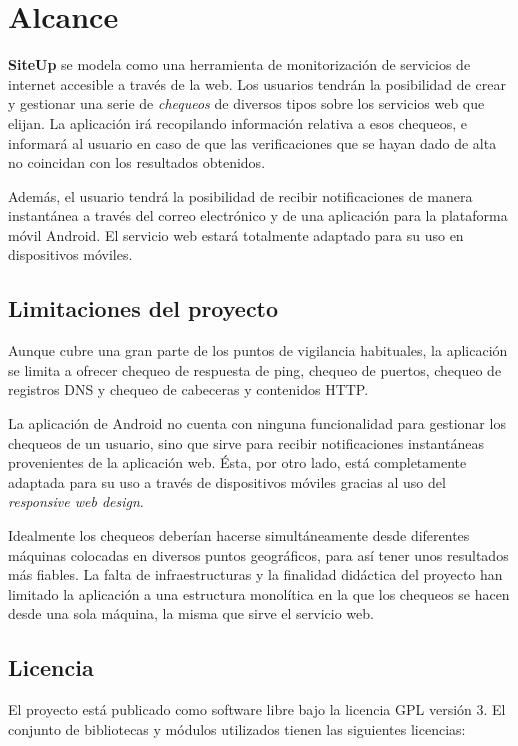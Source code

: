 \section{Alcance}
\textbf{SiteUp} se modela como una herramienta de monitorización de servicios de
internet accesible a través de la web. Los usuarios tendrán la posibilidad de
crear y gestionar una serie de \textit{chequeos} de diversos tipos sobre los
servicios web que elijan. La aplicación irá recopilando información relativa a
esos chequeos, e informará al usuario en caso de que las verificaciones que se
hayan dado de alta no coincidan con los resultados obtenidos.

Además, el usuario tendrá la posibilidad de recibir notificaciones de manera
instantánea a través del correo electrónico y de una aplicación para la
plataforma móvil Android. El servicio web estará totalmente adaptado para su uso
en dispositivos móviles.

\subsection{Limitaciones del proyecto}
Aunque cubre una gran parte de los puntos de vigilancia habituales, la
aplicación se limita a ofrecer chequeo de respuesta de ping, chequeo de puertos,
chequeo de registros DNS y chequeo de cabeceras y contenidos HTTP. 

La aplicación de Android no cuenta con ninguna funcionalidad para gestionar los
chequeos de un usuario, sino que sirve para recibir notificaciones instantáneas
provenientes de la aplicación web. Ésta, por otro lado, está completamente
adaptada para su uso a través de dispositivos móviles gracias al uso del
\textit{responsive web design}.

Idealmente los chequeos deberían hacerse simultáneamente desde diferentes
máquinas colocadas en diversos puntos geográficos, para así tener unos
resultados más fiables. La falta de infraestructuras y la finalidad didáctica
del proyecto han limitado la aplicación a una estructura monolítica en la que
los chequeos se hacen desde una sola máquina, la misma que sirve el servicio
web.

\subsection{Licencia}
El proyecto está publicado como software libre bajo la licencia
\ac{GPL} versión 3. El conjunto de bibliotecas y módulos utilizados
tienen las siguientes licencias:

